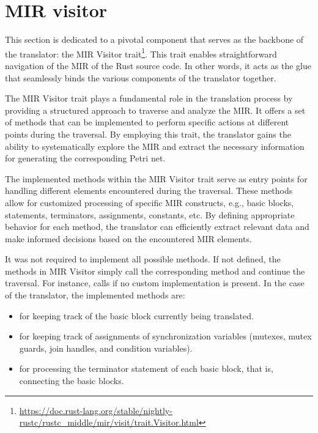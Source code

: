 \section{MIR visitor}

This section is dedicated to a pivotal component that serves as the backbone of the translator:
the MIR Visitor trait\footnote{\url{https://doc.rust-lang.org/stable/nightly-rustc/rustc_middle/mir/visit/trait.Visitor.html}}.
This trait enables straightforward navigation of the \acrshort{MIR} of the Rust source code.
In other words, it acts as the glue that seamlessly binds the various components of the translator together.

The MIR Visitor trait plays a fundamental role in the translation process
by providing a structured approach to traverse and analyze the \acrshort{MIR}.
It offers a set of methods that can be implemented to perform specific actions
at different points during the traversal.
By employing this trait,
the translator gains the ability to systematically explore the \acrshort{MIR}
and extract the necessary information for generating the corresponding Petri net.

The implemented methods within the MIR Visitor trait serve
as entry points for handling different elements encountered during the traversal.
These methods allow for customized processing of specific \acrshort{MIR} constructs,
e.g., basic blocks, statements, terminators, assignments, constants, etc.
By defining appropriate behavior for each method,
the translator can efficiently extract relevant data and
make informed decisions based on the encountered MIR elements.

It was not required to implement all possible methods.
If not defined, the methods in MIR Visitor simply call
the corresponding  method and continue the traversal.
For instance,  calls
 if no custom implementation is present.
In the case of the translator, the implemented methods are:

\begin{itemize}
  \item {} for keeping track of the basic block currently being translated.
  \item {} for keeping track of assignments of synchronization variables
        (mutexes, mutex guards, join handles, and condition variables).
  \item {} for processing the terminator statement of each basic block,
        that is, connecting the basic blocks.
\end{itemize}

